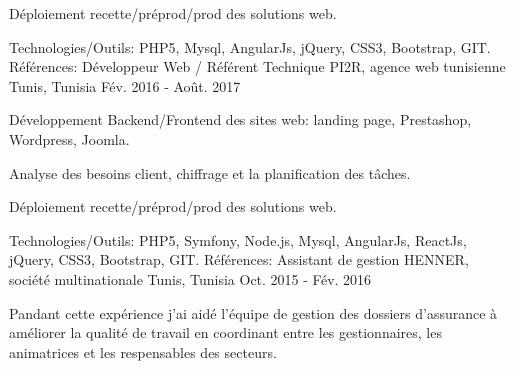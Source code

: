 \begin{cventries}
{\begin{cvitems}
        \item {Déploiement recette/préprod/prod des solutions web.}
      \end{cvitems}
    }
    {\textcolor{awesome}{Technologies/Outils: } {\color{graytext}}  {PHP5, Mysql, AngularJs, jQuery, CSS3, Bootstrap, GIT.}}
    {Références:} 
    {\href{http://www.cooperons.com/}{} \break
    \href{http://www.tisc.tn/ }{} \break
    }
  \techentries
    {Développeur Web / Référent Technique}
    {PI2R, agence web tunisienne}
    {Tunis, Tunisia}
    {Fév. 2016 - Août. 2017}
    {
      \begin{cvitems}
        \item {Développement Backend/Frontend des sites web: landing page, Prestashop, Wordpress, Joomla.}
        \item {Analyse des besoins client, chiffrage et la planification des tâches.}
        \item {Déploiement recette/préprod/prod des solutions web.}
      \end{cvitems}
    }
    {\textcolor{awesome}{Technologies/Outils: } {\color{graytext}}  {PHP5, Symfony, Node.js, Mysql, AngularJs, ReactJs, jQuery, CSS3, Bootstrap, GIT.}}
    {Références:} 
    {
      \href{http://www.tuttosport.tn/}{} \break
      \href{http://www.milddream.com/fr/ }{} \break
      \href{https://www.tvsoftconsult.com/ }{} \break
      \href{http://www.ordre-medecins.org.tn/fr/ }{} \break
      \href{http://orthodontiste-narimen-djerbi.com/ }{} \break
    }
  \techentries
    {Assistant de gestion}
    {HENNER, société multinationale}
    {Tunis, Tunisia}
    {Oct. 2015 - Fév. 2016}
    {
      \begin{cvitems}
        \item {Pandant cette expérience j'ai aidé l'équipe de gestion des dossiers d'assurance à améliorer la qualité de travail en coordinant entre les gestionnaires, les animatrices et les respensables des secteurs.}

\end{cvitems}}
\end{cventries}
